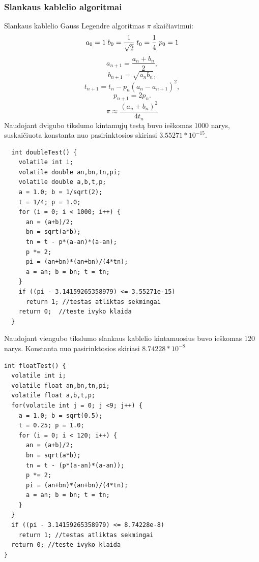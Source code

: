 \documentclass[a4paper, 12pt]{article} %
\begin{document}
\begin{onehalfspacing}
\subsubsection{Slankaus kablelio algoritmai}
Slankaus kablelio Gauss Legendre algoritmas $\pi$ skai\v{c}iavimui:
\begin{equation*}\label{xx}
a_{0}=1\;b_{0}=\frac{1}{\sqrt{2}}\;t_{0}=\frac{1}{4}\;p_{0}=1\\
\end{equation*}
\begin{equation*}
a_{n+1} = \frac{a_n + b_n}{2},
\end{equation*}
\begin{equation*}
b_{n+1} = \sqrt{a_n b_n}, 
\end{equation*}
\begin{equation*}
t_{n+1} = t_n - p_n(a_n - a_{n+1})^2, 
\end{equation*}
\begin{equation*}
p_{n+1} = 2p_n. 
\end{equation*}
\begin{equation}
\pi \approx \frac{(a_n+b_n)^2}{4t_n}
\end{equation}
Naudojant dvigubo tikslumo kintam\k{u}j\k{u} test\k{a} buvo ie\v{s}komas 1000 narys, suskai\v{c}iuota  
konstanta nuo pasirinktosios skiriasi $3.55271 * 10^{-15}$. 
\begin{verbatim}
  int doubleTest() { 
    volatile int i; 
    volatile double an,bn,tn,pi; 
    volatile double a,b,t,p;  
    a = 1.0; b = 1/sqrt(2); 
    t = 1/4; p = 1.0; 
    for (i = 0; i < 1000; i++) { 
      an = (a+b)/2;  
      bn = sqrt(a*b); 
      tn = t - p*(a-an)*(a-an);  
      p *= 2; 
      pi = (an+bn)*(an+bn)/(4*tn);  
      a = an; b = bn; t = tn; 
    }
    if ((pi - 3.14159265358979) <= 3.55271e-15) 
      return 1; //testas atliktas sekmingai
    return 0;  //teste ivyko klaida
  } 
\end{verbatim}
Naudojant viengubo tikslumo slankaus kablelio kintamuosius buvo ie\v{s}komas 120 narys. Konstanta nuo pasirinktosios skiriasi $8.74228* 10^{-8}$
\begin{verbatim}
int floatTest() {
  volatile int i;
  volatile float an,bn,tn,pi;
  volatile float a,b,t,p;
  for(volatile int j = 0; j <9; j++) {
    a = 1.0; b = sqrt(0.5);
    t = 0.25; p = 1.0;
    for (i = 0; i < 120; i++) {
      an = (a+b)/2;
      bn = sqrt(a*b);
      tn = t - (p*(a-an)*(a-an));
      p *= 2;
      pi = (an+bn)*(an+bn)/(4*tn);
      a = an; b = bn; t = tn;
    } 
  }
  if ((pi - 3.14159265358979) <= 8.74228e-8)
    return 1; //testas atliktas sekmingai
  return 0; //teste ivyko klaida
}
\end{verbatim}

\end{onehalfspacing}
\end{document}
